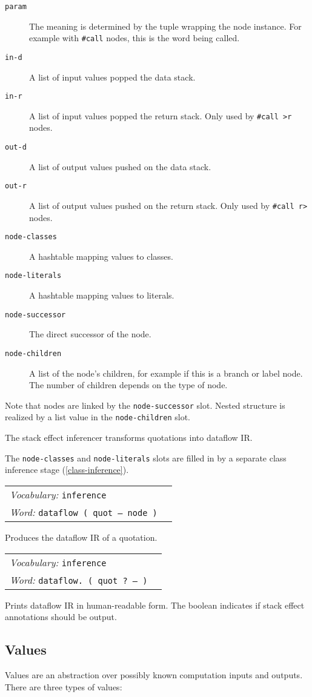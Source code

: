 \documentclass{book}
\newcommand{\vocabulary}[1]{\emph{Vocabulary:} \texttt{#1}&\\}
\newcommand{\ordinaryword}[2]{\index{\texttt{#1}}\emph{Word:} \texttt{#2}&\\}
\newcommand{\wordtable}[1]{


\begin{tabularx}{12cm}{lX}
\hline
#1
\hline
\end{tabularx}

}
\begin{document}
\begin{description}
\item[\texttt{param}] The meaning is determined by the tuple wrapping the node instance. For example with \verb|#call| nodes, this is the word being called.
\item[\texttt{in-d}] A list of input values popped the data stack.
\item[\texttt{in-r}] A list of input values popped the return stack. Only used by \verb|#call >r| nodes.
\item[\texttt{out-d}] A list of output values pushed on the data stack.
\item[\texttt{out-r}] A list of output values pushed on the return stack. Only used by \verb|#call r>| nodes.
\item[\texttt{node-classes}] A hashtable mapping values to classes.
\item[\texttt{node-literals}] A hashtable mapping values to literals.
\item[\texttt{node-successor}] The direct successor of the node.
\item[\texttt{node-children}] A list of the node's children, for example if this is a branch or label node. The number of children depends on the type of node.
\end{description}

Note that nodes are linked by the \verb|node-successor| slot. Nested structure is realized by a list value in the \verb|node-children| slot.

The stack effect inferencer transforms quotations into dataflow IR.

The \verb|node-classes| and \verb|node-literals| slots are filled in by a separate class inference stage (\ref{class-inference}).

\wordtable{
\vocabulary{inference}
\ordinaryword{dataflow}{dataflow ( quot -- node )}
}

Produces the dataflow IR of a quotation.

\wordtable{
\vocabulary{inference}
\ordinaryword{dataflow.}{dataflow.~( quot ? -- )}
}

Prints dataflow IR in human-readable form. The boolean indicates if stack effect annotations should be output.

\subsection{Values}

Values are an abstraction over possibly known computation inputs and outputs. There are three types of values:
\end{document}
